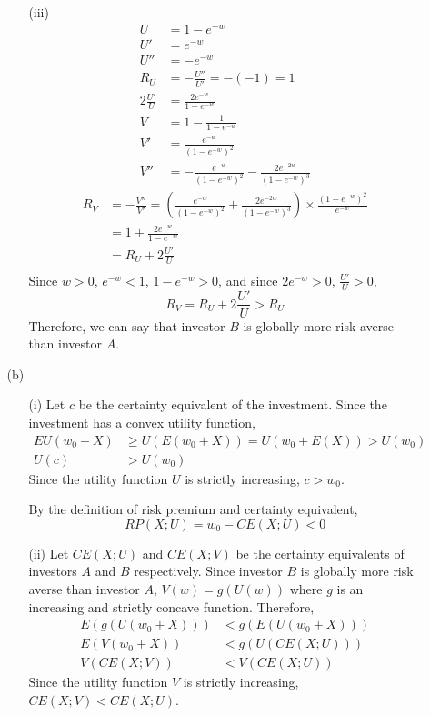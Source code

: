 \documentclass{article}
\begin{document}
\begin{enumerate}
\begin{itemize}
\begin{itemize}
\item[(iii)]
\begin{align*}
U&=1-e^{-w} \\
U'&=e^{-w} \\
U''&=-e^{-w} \\
R_U&=-\frac{U''}{U'}=-(-1)=1 \\
2 \frac{U'}{U}&=\frac{2e^{-w}}{1-e^{-w}} \\
V&=1- \frac{1}{1-e^{-w}} \\
V'&= \frac{e^{-w}}{(1-e^{-w})^2} \\
V''&= - \frac{e^{-w}}{(1-e^{-w})^2} - \frac{2e^{-2w}}{(1-e^{-w})^3} 
\end{align*}
\begin{align*}
R_V&=- \frac{V''}{V'}=\left(\frac{e^{-w}}{(1-e^{-w})^2} + \frac{2e^{-2w}}{(1-e^{-w})^3}\right) \times \frac{(1-e^{-w})^2}{e^{-w}} \\
&=1+ \frac{2e^{-w}}{1-e^{-w}} \\ 
&=R_U+2 \frac{U'}{U} \\
\end{align*}
Since $w>0$, $e^{-w}<1$, $1-e^{-w}>0$, and since $2e^{-w}>0$, $\frac{U'}{U}>0$,
\[R_V=R_U+2 \frac{U'}{U} > R_U\]
Therefore, we can say that investor $B$ is globally more risk averse than investor $A$.\\

\end{itemize}
\item[(b)]
\begin{itemize}
\item[(i)]
Let $c$ be the certainty equivalent of the investment. Since the investment has a convex utility function, 
\begin{align*}
EU(w_0 + X) &\geq U(E(w_0 + X)) = U(w_0+E(X)) > U(w_0) \\
U(c) &> U(w_0) 
\end{align*}
Since the utility function $U$ is strictly increasing, $c>w_0$.

By the definition of risk premium and certainty equivalent, 
\[RP(X;U)=w_0-CE(X;U)<0\]

\item[(ii)]
Let $CE(X;U)$ and $CE(X;V)$ be the certainty equivalents of investors $A$ and $B$ respectively. Since investor $B$ is globally more risk averse than investor $A$, $V(w)=g(U(w))$ where $g$ is an increasing and strictly concave function. Therefore,
\begin{align*}
E(g(U(w_0+X)))&<g(E(U(w_0+X))) \\
E(V(w_0+X))&<g(U(CE(X;U))) \\
V(CE(X;V))&<V(CE(X;U)) 
\end{align*}
Since the utility function $V$ is strictly increasing, $CE(X;V) < CE(X;U)$.


\end{itemize}
\end{itemize}
\end{enumerate}
\end{document}
